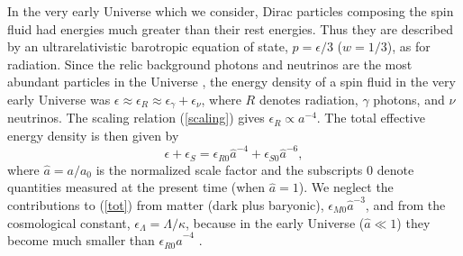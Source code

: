 \documentclass[prd,onecolumn,nofootinbib,showkeys]{revtex4}
\begin{document}
In the very early Universe which we consider, Dirac particles composing the spin fluid had energies much greater than their rest energies.
Thus they are described by an ultrarelativistic barotropic equation of state, $p=\epsilon/3$ ($w=1/3$), as for radiation.
Since the relic background photons and neutrinos are the most abundant particles in the Universe \cite{Ric}, the energy density of a spin fluid in the very early Universe was $\epsilon\approx\epsilon_R\approx\epsilon_\gamma+\epsilon_\nu$, where $R$ denotes radiation, $\gamma$ photons, and $\nu$ neutrinos.
The scaling relation (\ref{scaling}) gives $\epsilon_R\propto a^{-4}$.
The total effective energy density is then given by
\begin{equation}
\epsilon+\epsilon_S=\epsilon_{R0}\hat{a}^{-4}+\epsilon_{S0}\hat{a}^{-6},
\label{tot}
\end{equation}
where $\hat{a}=a/a_0$ is the normalized scale factor and the subscripts $0$ denote quantities measured at the present time (when $\hat{a}=1$).
We neglect the contributions to (\ref{tot}) from matter (dark plus baryonic), $\epsilon_{M0}\hat{a}^{-3}$, and from the cosmological constant, $\epsilon_\Lambda=\Lambda/\kappa$, because in the early Universe ($\hat{a}\ll 1$) they become much smaller than $\epsilon_{R0}\hat{a}^{-4}$ \cite{Ric}.
\end{document}
